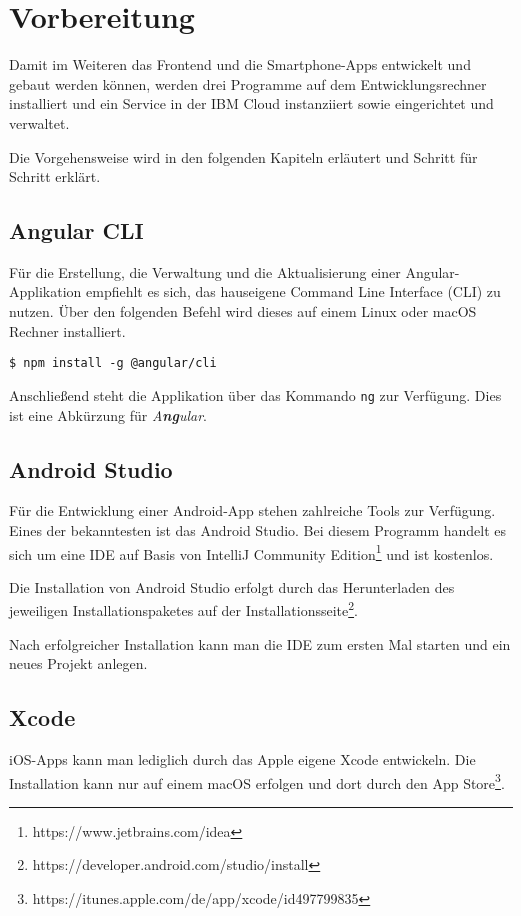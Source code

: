 \section{Vorbereitung}
Damit im Weiteren das Frontend und die Smartphone-Apps entwickelt und gebaut werden können, werden drei Programme auf
dem Entwicklungsrechner installiert und ein Service in der IBM Cloud instanziiert sowie eingerichtet und verwaltet.

Die Vorgehensweise wird in den folgenden Kapiteln erläutert und Schritt für Schritt erklärt.

\subsection{Angular CLI}
Für die Erstellung, die Verwaltung und die Aktualisierung einer Angular-Applikation empfiehlt es sich, das hauseigene
Command Line Interface (CLI) zu nutzen. Über den folgenden Befehl wird dieses auf einem Linux oder macOS Rechner
installiert.

\begin{lstlisting}[caption=Installation des Angular CLI, label=ls:vorbereitung_angularcli]
    $ npm install -g @angular/cli
\end{lstlisting}

Anschließend steht die Applikation über das Kommando \texttt{ng} zur Verfügung. Dies ist eine Abkürzung für
\textit{A\textbf{ng}ular}.

\subsection{Android Studio}
Für die Entwicklung einer Android-App stehen zahlreiche Tools zur Verfügung. Eines der bekanntesten ist das Android
Studio. Bei diesem Programm handelt es sich um eine IDE auf Basis von IntelliJ Community
Edition\footnote{https://www.jetbrains.com/idea} und ist kostenlos.

Die Installation von Android Studio erfolgt durch das Herunterladen des jeweiligen Installationspaketes auf der
Installationsseite\footnote{https://developer.android.com/studio/install}.

Nach erfolgreicher Installation kann man die IDE zum ersten Mal starten und ein neues Projekt anlegen.

\subsection{Xcode}
iOS-Apps kann man lediglich durch das Apple eigene Xcode entwickeln. Die Installation kann nur auf einem macOS
erfolgen und dort durch den App Store\footnote{https://itunes.apple.com/de/app/xcode/id497799835}.

